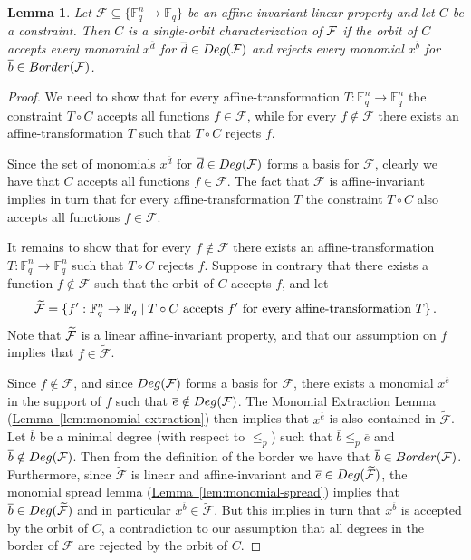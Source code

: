 \documentclass[10pt]{article}
\newtheorem{lemma}[theorem]{Lemma}
\theoremstyle{definition}
\numberwithin{equation}{section}
\newcommand{\expref}[2]{\texorpdfstring{\hyperref[#2]{#1~\ref{#2}}}{#1~\ref{#2}}}
\newcommand{\calf}{{\cal F}}
\newcommand{\F}{{\mathbb{F}}}
\newcommand{\cF}{{\mathcal{F}}}
\newcommand{\Border}{{\rm{Border}}}
\newcommand{\Deg}{{\rm{Deg}}}
\begin{document}
\begin{lemma}\label{lem:border-single-orbit}
Let $\mathcal{F} \subseteq \{\F_q^n \to \F_q\}$ be an
affine-invariant linear property and let $C$ be a constraint.
Then $C$ is a single-orbit characterization of $\calf$ if the orbit of
$C$ accepts every monomial $x^{\overline d}$ for $\overline d \in \Deg(\calf)$ and
rejects every monomial $x^{\overline b}$ for $\overline b \in \Border(\calf)$.
\end{lemma}

\begin{proof}
We need to show that for every affine-transformation $T:\F_q^n \to \F_q^n$ the constraint $T \circ C$ accepts all functions $f \in \cF$,
while for every $f \notin \cF$ there exists an affine-transformation $T$ such that $T \circ C$ rejects $f$.

Since the set of monomials $x^{\overline d}$ for $\overline d \in \Deg(\cF)$ forms a basis for $\cF$, clearly we have that $C$ accepts all functions $f \in \cF$. The fact that $\cF$ is affine-invariant implies in turn that for every affine-transformation $T$ the constraint $T \circ C$ also accepts all functions $f \in \cF$.

It remains to show that for every $f \notin \cF$ there exists an affine-transformation $T: \F_q^n \to \F_q^n$ such that $T \circ C$ rejects $f$.
Suppose in contrary that there exists a function $f \notin \cF$ such that the orbit of $C$ accepts $f$, and
let \[{\widetilde \calf} = \{f' : \F_q^n \to \F_q \;|\;
T \circ C \text{~accepts~} f' \text{~for~every~affine-transformation~}T\}\,. \]
Note that $\widetilde \calf$ is a linear affine-invariant property, and that our assumption on $f$ implies that $f \in {\widetilde \cF}$.

Since $f \notin \cF$, and since $\Deg(\cF)$ forms a basis for $\cF$, there exists a monomial $x^{\overline e}$ in the support of $f$ such that $\overline e \notin \Deg(\cF)$. The 
%
Monomial Extraction Lemma %
(\expref{Lemma}{lem:monomial-extraction}) then implies that $x^{\overline e}$ is also contained in $\widetilde \cF$. Let $\overline b$ be a minimal degree (with respect to $\leq_p$) such that $\overline b \leq_p \overline e$ and $\overline b \notin \Deg(\cF)$. Then from the definition of the border we have that $\overline b \in \Border(\cF)$. Furthermore, since $\widetilde \cF$ is linear and affine-invariant and $\overline e \in \Deg({\widetilde \cF})$,
the monomial spread lemma (\expref{Lemma}{lem:monomial-spread}) implies that $\overline b \in \Deg({\widetilde \cF})$ and in particular $x^{\overline b} \in \widetilde \cF$.
But this implies in turn that  $x^{\overline b}$ is accepted by the orbit of $C$, a contradiction to our assumption that all degrees in the 
%
border of
$\cF$ are rejected by the orbit of $C$.
\end{proof}
\end{document}
